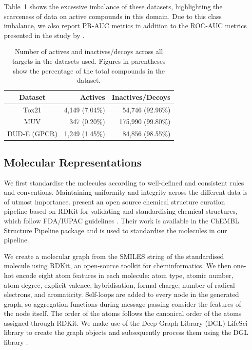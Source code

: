\documentclass[journal=jcisd8,manuscript=article]{achemso} %
\begin{document}
Table~\ref{table:datasetimbalance} shows the excessive imbalance of these datasets, highlighting the scarceness of data on active compounds in this domain. Due to this class imbalance, we also report PR-AUC metrics in addition to the ROC-AUC metrics presented in the study by \citet{altae2017low}.

\begin{table}[h]
    \centering
    \caption{Number of actives and inactives/decoys across all targets in the datasets used. Figures in parentheses show the percentage of the total compounds in the dataset.}
    \begin{tabular}{@{}crr@{}}
        \hline
        Dataset         & Actives           & Inactives/Decoys \\
        \hline
        Tox21           & 4,149 (7.04\%)    & 54,746 (92.96\%) \\
        MUV             & 347 (0.20\%)      & 175,990 (99.80\%) \\
        DUD-E (GPCR)    & 1,249 (1.45\%)    & 84,856 (98.55\%) \\
        \hline              
    \end{tabular}
    \label{table:datasetimbalance}
\end{table}

\subsection{Molecular Representations}

We first standardise the molecules according to well-defined and consistent rules and conventions. Maintaining uniformity and integrity across the different data is of utmost importance. \citet{bento2020open} present an open source chemical structure curation pipeline based on RDKit\citep{rdkit} for validating and standardising chemical structures, which follow FDA/IUPAC guidelines \citep{brecher2006graphical, food2007substance}. Their work is available in the ChEMBL Structure Pipeline package \citep{bento2020open} and is used to standardise the molecules in our pipeline. 

We create a molecular graph from the SMILES string of the standardised molecule using RDKit, an open-source toolkit for cheminformatics. We then one-hot encode eight atom features in each molecule: atom type, atomic number, atom degree, explicit valence, hybridisation, formal charge, number of radical electrons, and aromaticity. Self-loops are added to every node in the generated graph, so aggregation functions during message passing consider the features of the node itself. The order of the atoms follows the canonical order of the atoms assigned through RDKit. We make use of the Deep Graph Library (DGL) LifeSci \cite{dgllife} library to create the graph objects and subsequently process them using the DGL library \cite{wang2019dgl}.
\end{document}
